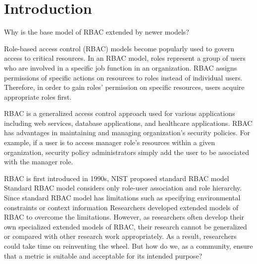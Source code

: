 \section{Introduction} \label{sec:introduction}

Why is the base model of RBAC extended by newer models?

Role-based access control (RBAC) models \cite{ferraiolo-rbac} become popularly used to govern access to critical resources.  In an RBAC model, roles represent a group of users who are involved in a specific job function in an organization. RBAC assigns permissions of specific actions on resources to roles instead of individual users.  Therefore, in order to gain roles' permission on specific resources, users acquire appropriate roles first.

RBAC is a generalized access control approach used for various applications including web services, database applications, and healthcare applications.  RBAC has advantages in maintaining and managing organization's security policies.  For example, if a user is to access manager role's resources within a given organization, security policy administrators simply add the user to be associated with the manager role.

RBAC is first introduced in 1990s, NIST proposed standard RBAC model \cite{ferraiolo-rbac}
Standard RBAC model considers only role-user association and role hierarchy.
Since standard RBAC model has limitations such as specifying environmental constraints or context information
Researchers developed extended models of RBAC to overcome the limitations.
However, as researchers often develop their own specialized extended models of RBAC,
their research cannot be generalized or compared with other research work appropriately.
As a result, researchers could take time on reinventing the wheel.
But how do we, as a community, ensure that a metric is suitable and acceptable for its intended purpose?

